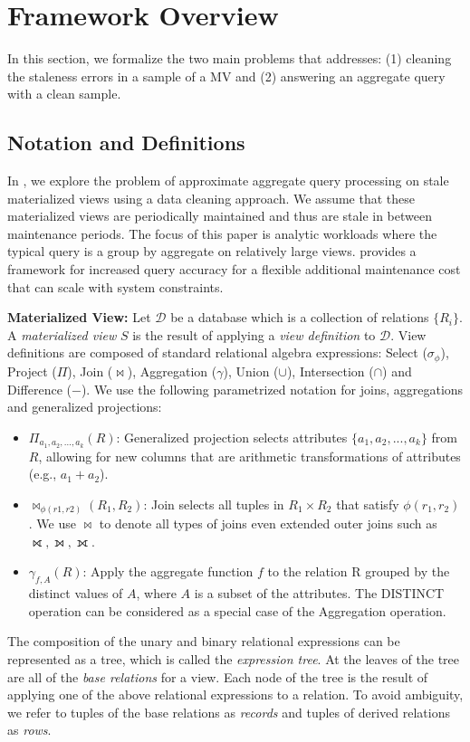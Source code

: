 \vspace{-1em}
\section{Framework Overview}\label{sec-arch}
In this section, we formalize the two main problems that \svc addresses: (1) cleaning the staleness errors in a sample of a MV and (2) answering an aggregate query with a clean sample.

\subsection{Notation and Definitions}\label{notation}
In \svc, we explore the problem of approximate aggregate query processing on stale materialized views using a data cleaning approach.
We assume that these materialized views are periodically maintained and thus are stale in between maintenance periods.
The focus of this paper is analytic workloads where the typical query is a group by aggregate on relatively large views.
\svc provides a framework for increased query accuracy for a flexible additional maintenance cost that can scale with system constraints.

\noindent \textbf{Materialized View:} Let $\mathcal{D}$ be a database which is a collection of relations $\{R_i\}$. A \emph{materialized view} $S$ is the result of applying a \emph{view definition} to $\mathcal{D}$. 
View definitions are composed of standard relational algebra expressions: Select ($\sigma_{\phi}$), Project ($\Pi$), Join ($\bowtie$), Aggregation ($\gamma$), Union ($\cup$), Intersection ($\cap$) and Difference ($-$). 
We use the following parametrized notation for joins, aggregations and generalized projections:
\begin{itemize}[noitemsep] \sloppy
	\item $\Pi_{a_1,a_2,...,a_k}(R)$: Generalized projection selects attributes $\{a_1,a_2,...,a_k\}$ from $R$, allowing for new columns that are arithmetic transformations of attributes (e.g., $a_1+a_2$).
	\item $\bowtie_{\phi (r1,r2)}(R_1,R_2)$: Join selects all tuples in $R_1 \times R_2$ that satisfy $\phi (r_1,r_2)$. We use $\bowtie$ to denote all types of joins even extended outer joins such as $\rightouterjoin,\leftouterjoin,\fullouterjoin$.
	\item $\gamma_{f,A}(R)$: Apply the aggregate function $f$ to the relation R grouped by the distinct values of $A$, where $A$ is a subset of the attributes.  
	The DISTINCT operation can be considered as a special case of the Aggregation operation. 
\end{itemize}
The composition of the unary and binary relational expressions can be represented as a tree, which is called the \emph{expression tree}.
At the leaves of the tree are all of the \emph{base relations} for a view.
Each node of the tree is the result of applying one of the above relational expressions to a relation.
To avoid ambiguity, we refer to tuples of the base relations as \emph{records} and tuples of derived relations as \emph{rows}.

